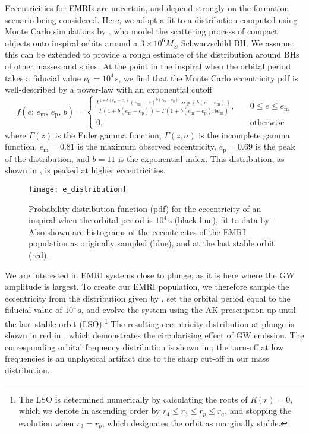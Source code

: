 Eccentricities for EMRIs are uncertain, and depend strongly on the formation scenario being considered. Here, we adopt a fit to a distribution computed using Monte Carlo simulations by \citet{hopman_orbital_2005}, who model the scattering process of compact objects onto inspiral orbits around a $3 \times 10^6 M_\odot$ Schwarzschild BH. We assume this can be extended to provide a rough estimate of the distribution around BHs of other masses and spins. At the point in the inspiral when the orbital period takes a fiducial value $\nu_0 = 10^4\,\mathrm{s}$, we find that the Monte Carlo eccentricity pdf is well-described by a power-law with an exponential cutoff
\begin{equation}
\label{eq:EMRI-e-distribution}
f(e;\,e_\mathrm{m},\,e_\mathrm{p},\,b) = 
	\begin{cases}
		\displaystyle\frac{b^{1+b(e_\mathrm{m}-e_\mathrm{p})} \left(e_\mathrm{m}-e\right)^{b(e_\mathrm{m}-e_\mathrm{p})} \exp\left\{b(e-e_\mathrm{m})\right\} }{\Gamma\left(1+b(e_\mathrm{m}-e_\mathrm{p})\right) - \Gamma\left(1+b(e_\mathrm{m}-e_\mathrm{p}), b e_\mathrm{m}\right)}, &\quad 0 \leq e \leq e_\mathrm{m}\\
		0, &\quad\text{otherwise}
	\end{cases}
\end{equation}
where $\Gamma(z)$ is the Euler gamma function, $\Gamma(z,a)$ is the incomplete gamma function, $e_\mathrm{m} = 0.81$ is the maximum observed eccentricity, $e_\mathrm{p} = 0.69$ is the peak of the distribution, and $b=11$ is the exponential index. This distribution, as shown in , is peaked at higher eccentricities.

\begin{figure}[htbp]
\centering
\texttt{[image: e\_distribution]}
\caption{\label{fig:EMRI-e-distribution}Probability distribution function (pdf) for the eccentricity of an inspiral when the orbital period is $10^4\,\mathrm{s}$ (black line), fit to data by \citet{hopman_orbital_2005}. Also shown are histograms of the eccentricites of the EMRI population as originally sampled (blue), and at the last stable orbit (red).}
\end{figure}

We are interested in EMRI systems close to plunge, as it is here where the GW amplitude is largest. To create our EMRI population, we therefore sample the eccentricity from the distribution given by , set the orbital period equal to the fiducial value of $10^4\,\mathrm{s}$, and evolve the system using the AK prescription up until the last stable orbit (LSO).\footnote{The LSO is determined numerically by calculating the roots of $R(r)=0$, which we denote in ascending order by $r_4 \leq r_3 \leq r_p \leq r_a$, and stopping the evolution when $r_3 = r_p$, which designates the orbit as marginally stable.} The resulting eccentricity distribution at plunge is shown in red in , which demonstrates the circularising effect of GW emission. The corresponding orbital frequency distribution is shown in ; the turn-off at low frequencies is an unphysical artifact due to the sharp cut-off in our mass distribution.

